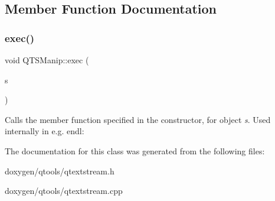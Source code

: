 \subsection{Member Function Documentation}
\mbox{\label{class_q_t_s_manip_ab314976728bf3e96ea881ba137d3ff37}} 
\subsubsection{\texorpdfstring{exec()}{exec()}}
{\footnotesize\ttfamily void Q\+T\+S\+Manip\+::exec (\begin{DoxyParamCaption}\item[{\mbox{\hyperlink{class_q_text_stream}{Q\+Text\+Stream}} \&}]{s }\end{DoxyParamCaption})\hspace{0.3cm}{\ttfamily [inline]}}

Calls the member function specified in the constructor, for object {\itshape s}. Used internally in e.\+g. endl\+:


\begin{DoxyCode}{0}
\end{DoxyCode}
 

The documentation for this class was generated from the following files\+:\begin{DoxyCompactItemize}
\item 
doxygen/qtools/qtextstream.\+h\item 
doxygen/qtools/qtextstream.\+cpp\end{DoxyCompactItemize}
